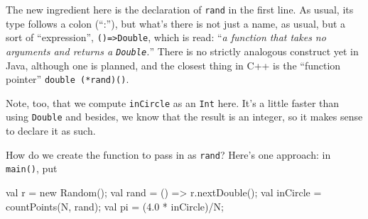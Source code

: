 The new ingredient here is the declaration of {\tt rand} in the first line.
As usual, its type follows
a colon (``:''), but what's there is not just a name, as usual, but a sort
of ``expression'', 
{\tt ()=>Double}, which is read:
``{\em a function that takes no arguments and returns a {\tt Double}.}''
There is no strictly analogous construct yet in Java, although one is planned, 
and the closest thing in C++ is the ``function pointer'' {\tt double (*rand)()}.

Note, too, that we compute {\tt inCircle} as an {\tt Int} here.  It's a little
faster than using {\tt Double} and besides, we know that the result is an
integer, so it makes sense to declare it as such.  

How do we create the function to pass in as {\tt rand}?  Here's one approach: in
{\tt main()}, put
\begin{xtennum}[]
       val r = new Random();              
       val rand = () => r.nextDouble();   
       val inCircle = countPoints(N, rand); 
       val pi = (4.0 * inCircle)/N;       
\end{xtennum}
 
